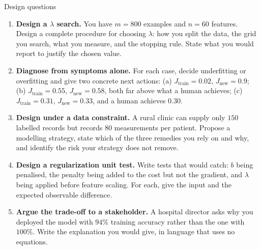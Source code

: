 \documentclass[aspectratio=169,10pt]{beamer}
\begin{document}
\begin{frame}{Design questions}
  \footnotesize
  \begin{enumerate}
    \item \textbf{Design a $\lambda$ search.} You have $m=800$ examples and $n=60$ features.
          Design a complete procedure for choosing $\lambda$: how you split the data, the grid
          you search, what you measure, and the stopping rule. State what you would report to
          justify the chosen value. \hfill{}
    \item \textbf{Diagnose from symptoms alone.} For each case, decide underfitting or
          overfitting and give two concrete next actions: (a) $J_{\text{train}}=0.02$,
          $J_{\text{new}}=0.9$; (b) $J_{\text{train}}=0.55$, $J_{\text{new}}=0.58$, both far
          above what a human achieves; (c) $J_{\text{train}}=0.31$, $J_{\text{new}}=0.33$, and
          a human achieves $0.30$. \hfill{}
    \item \textbf{Design under a data constraint.} A rural clinic can supply only $150$
          labelled records but records $80$ measurements per patient. Propose a modelling
          strategy, state which of the three remedies you rely on and why, and identify the
          risk your strategy does not remove. \hfill{}
    \item \textbf{Design a regularization unit test.} Write tests that would catch: $b$ being
          penalised, the penalty being added to the cost but not the gradient, and $\lambda$
          being applied before feature scaling. For each, give the input and the expected
          observable difference. \hfill{}
    \item \textbf{Argue the trade-off to a stakeholder.} A hospital director asks why you
          deployed the model with $94\%$ training accuracy rather than the one with $100\%$.
          Write the explanation you would give, in language that uses no equations.
          \hfill{}
  \end{enumerate}
\end{frame}
\end{document}
